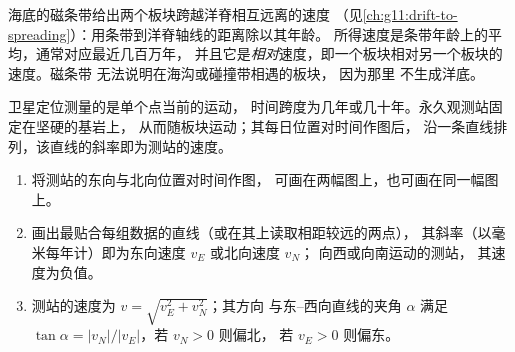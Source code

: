 海底的磁条带给出两个板块跨越洋脊相互远离的速度
（见\cref{ch:g11:drift-to-spreading}）：用条带到洋脊轴线的距离除以其年龄。
所得速度是条带年龄上的平均，通常对应最近几百万年，
并且它是\emph{相对}速度，即一个板块相对另一个板块的速度。磁条带
无法说明在海沟或碰撞带相遇的板块，
因为那里
不生成洋底。

卫星定位测量的是单个点当前的运动，
时间跨度为几年或几十年。永久观测站固定在坚硬的基岩上，
从而随板块运动；其每日位置对时间作图后，
沿一条直线排列，该直线的斜率即为测站的速度。

\begin{method}[由定位时间序列求速率]\label{met:g11:plate-motions:rate}
\begin{enumerate}
  \item 将测站的东向与北向位置对时间作图，
        可画在两幅图上，也可画在同一幅图上。
  \item 画出最贴合每组数据的直线（或在其上读取相距较远的两点），
        其斜率（以毫米每年计）即为东向速度 $v_E$ 或北向速度 $v_N$；
        向西或向南运动的测站，
        其速度为负值。
  \item 测站的速度为 $v = \sqrt{v_E^2 + v_N^2}$；其方向
        与东–西向直线的夹角 $\alpha$ 满足
        $\tan\alpha = |v_N|/|v_E|$，若 $v_N > 0$ 则偏北，
        若 $v_E > 0$ 则偏东。
\end{enumerate}
\end{method}

